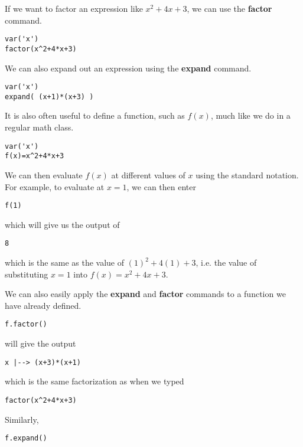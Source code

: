 If we want to factor an expression like $x^2+4x+3$, we can use
the  \textbf{factor} command.

\begin{verbatim}
var('x')
factor(x^2+4*x+3)
\end{verbatim}

We can also expand out an expression using the \textbf{expand} command.

\begin{verbatim}
var('x')
expand( (x+1)*(x+3) )
\end{verbatim}

It is also often useful to define a function, such as $f(x)$, much like
we do in a regular math class.

\begin{verbatim}
var('x')
f(x)=x^2+4*x+3
\end{verbatim}

We can then evaluate $f(x)$ at different values of $x$ using the standard
notation. For example, to evaluate at $x=1$, we can then enter

\begin{verbatim}
f(1)
\end{verbatim}

which will give us the output of

\begin{verbatim}
8
\end{verbatim}

which is the same as the value of $(1)^2+4(1)+3$, i.e. the value of
substituting $x=1$ into $f(x)=x^2+4x+3$.

We can also easily apply the \textbf{expand} and \textbf{factor}
commands to a function we have already defined.

\begin{verbatim}
f.factor()
\end{verbatim}

will give the output

\begin{verbatim}
x |--> (x+3)*(x+1)
\end{verbatim}

which is the same factorization as when we typed

\begin{verbatim}
factor(x^2+4*x+3)
\end{verbatim}

Similarly,

\begin{verbatim}
f.expand()
\end{verbatim}

